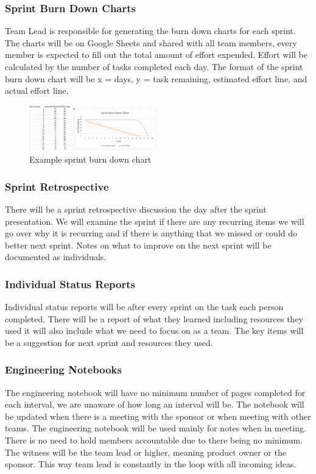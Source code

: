 \subsubsection{Sprint Burn Down Charts}
Team Lead is responsible for generating the burn down charts for each sprint. The charts will be on Google Sheets and shared with all team members, every member is expected to fill out the total amount of effort expended. Effort will be calculated by the number of tasks completed each day. The format of the sprint burn down chart will be x = days, y = task remaining, estimated effort line, and actual effort line.

\begin{figure}[h]
    \centering
    \includegraphics[width=0.5\textwidth]{images/SprintBurn}
    \caption{Example sprint burn down chart}
\end{figure}

\subsubsection{Sprint Retrospective}
There will be a sprint retrospective discussion the day after the sprint presentation. We will examine the sprint if there are any recurring items we will go over why it is recurring and if there is anything that we missed or could do better next sprint. Notes on what to improve on the next sprint will be documented as individuals. 


\subsubsection{Individual Status Reports}
Individual status reports will be after every sprint on the task each person completed. There will be a report of what they learned including resources they used it will also include what we need to focus on as a team. The key items will be a suggestion for next sprint and resources they used.

\subsubsection{Engineering Notebooks}
The engineering notebook will have no minimum number of pages completed for each interval, we are unaware of how long an interval will be. The notebook will be updated when there is a meeting with the sponsor or when meeting with other teams. The engineering notebook will be used mainly for notes when in meeting. There is no need to hold members accountable due to there being no minimum. The witness will be the team lead or higher, meaning product owner or the sponsor. This way team lead is constantly in the loop with all incoming ideas. 

